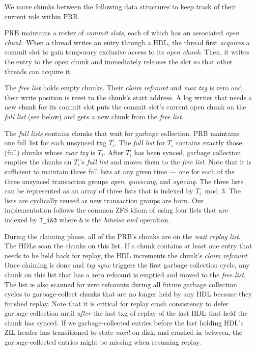 \documentclass[12pt,a4paper,twoside]{book}
\begin{document}
We move chunks between the following data structures to keep track of their current role within PRB.
\begin{description}[noitemsep]
    \item[Commit Slots]
    PRB maintains a roster of \textit{commit slots}, each of which has an associated \textit{open chunk}.
    When a thread writes an entry through a HDL, the thread first \textit{acquires} a commit slot to gain temporary exclusive access to its \textit{open chunk}.
    Then, it writes the entry to the open chunk and immediately releases the slot so that other threads can acquire it.
    \item[Free List]
    The \textit{free list} holds empty chunks.
    Their \textit{claim refcount} and \textit{max txg} is zero and their write position is reset to the chunk's start address.
    A log writer that needs a new chunk for its commit slot puts the commit slot's current open chunk on the \textit{full list} (see below) and gets a new chunk from the \textit{free list}.
    \item[Full Lists]
    The \textit{full lists} contains chunks that wait for garbage collection.
    PRB maintains one full list for each unsynced txg $T_i$. The \textit{full list} for $T_i$ contains exactly those (full) chunks whose \textit{max txg} is $T_i$.
    After $T_i$ has been synced, garbage collection empties the chunks on $T_i$'s \textit{full list} and moves them to the \textit{free list}.
    Note that it is sufficient to maintain three full lists at any given time --- one for each of the three unsynced transaction groups \textit{open}, \textit{quiescing}, and \textit{syncing}.
    The three lists can be represented as an array of three lists that is indexed by $T_i \bmod 3$.
    The lists are cyclically reused as new transaction groups are born.
    Our implementation follows the common ZFS idiom of using four lists that are indexed by \lstinline{T_i&3} where \lstinline{&} is the \textit{bitwise and} operation.
    \item[Wait Replay List]
    During the claiming phase, all of the PRB's chunks are on the \textit{wait replay list}.
    The HDLs scan the chunks on this list.
    If a chunk contains at least one entry that needs to be held back for replay, the HDL increments the chunk's \textit{claim refcount}.
    Once claiming is done and \textit{txg sync} triggers the first garbage collection cycle, any chunk on this list that has a zero refcount is emptied and moved to the \textit{free list}.
    The list is also scanned for zero refcounts during all future garbage collection cycles to garbage-collect chunks that are no longer held by any HDL because they finished replay.
    Note that it is critical for replay crash consistency to defer garbage collection until \textit{after} the last txg of replay of the last HDL that held the chunk has synced.
    If we garbage-collected entries before the last holding HDL's ZIL header has transitioned to state \textit{nozil} on disk, and crashed in between, the garbage-collected entries might be missing when resuming replay.
\end{description}
\end{document}
